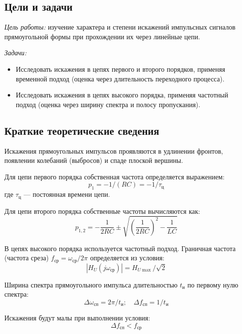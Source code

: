 \subsection*{Цели и задачи}
\textit{Цель работы:} изучение характера и степени искажений импульсных сигналов прямоугольной формы при прохождении их через линейные цепи.

\textit{Задачи:}
\begin{itemize}
    \item Исследовать искажения в цепях первого и второго порядков, применяя временной подход (оценка через длительность переходного процесса).
    \item Исследовать искажения в цепях высокого порядка, применяя частотный подход (оценка через ширину спектра и полосу пропускания).
\end{itemize}

\subsection*{Краткие теоретические сведения}
Искажения прямоугольных импульсов проявляются в удлинении фронтов, появлении колебаний (выбросов) и спаде плоской вершины.

Для цепи первого порядка собственная частота определяется выражением:
\begin{equation}
    p_1 = -1/(RC) = -1/\tau_{\text{ц}}
\end{equation}
где $\tau_{\text{ц}}$ --- постоянная времени цепи.

Для цепи второго порядка собственные частоты вычисляются как:
\begin{equation}
    p_{1,2} = -\frac{1}{2RC} \pm \sqrt{\left(\frac{1}{2RC}\right)^2 - \frac{1}{LC}}
\end{equation}

В цепях высокого порядка используется частотный подход. Граничная частота (частота среза) $f_{\text{ср}} = \omega_{\text{ср}} / 2\pi$ определяется из условия:
\begin{equation}
    |H_U(j\omega_{\text{ср}})| = H_{U\max} / \sqrt{2}
\end{equation}

Ширина спектра прямоугольного импульса длительностью $t_{\text{и}}$ по первому нулю спектра:
\begin{equation}
    \Delta\omega_{\text{сп}} = 2\pi / t_{\text{и}}; \quad \Delta f_{\text{сп}} = 1 / t_{\text{и}}
\end{equation}

Искажения будут малы при выполнении условия:
\begin{equation}
    \Delta f_{\text{сп}} < f_{\text{ср}}
\end{equation}

